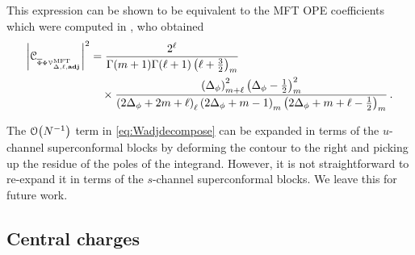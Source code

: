 \documentclass[11pt]{article}
\newcommand{\Phib}{\overline{\Phi}}
\newcommand{\cope}[1]{\mathcal{C}_{_{#1}}}
\begin{document}
%
This expression can be shown to be equivalent to the MFT OPE coefficients which were computed in \cite{Bobev:2015jxa}, who obtained 
%
\begin{equation}\label{eq:MFTOPEcoeffs}
\begin{split}
\abs{\cope{\Phib\Phi\mathcal{V}^{\text{\tiny MFT}}_{\Delta,\ell,{\bf adj}}}}^2
&= 
  \frac{2^{\ell}}{\Gamma(m+1)\Gamma(\ell+1) \left( \ell+\frac{3}{2}\right)_{m} } \\
& \quad \times 
  \frac{\left(\Delta_{\phi}\right)_{m+\ell}^{2} \left(\Delta_{\phi}-\frac{1}{2}\right)_{m}^{2}}{  \left(2\Delta_{\phi}+2m+\ell\right)_{\ell} \left(2\Delta_{\phi}+m-1\right)_{m} \left(2\Delta_{\phi}+m+\ell-\frac{1}{2}\right)_{m}} \,.
\end{split}
\end{equation}
%


The $\order{N^{-1}}$ term in \eqref{eq:Wadjdecompose} can be expanded in terms of the $u$-channel superconformal blocks by deforming the contour to the right and picking up the residue of the poles of the integrand. However, it is not straightforward to re-expand it in terms of the $s$-channel superconformal blocks. We leave this for future work.



\subsection{Central charges}
\label{sec:central}
\end{document}
